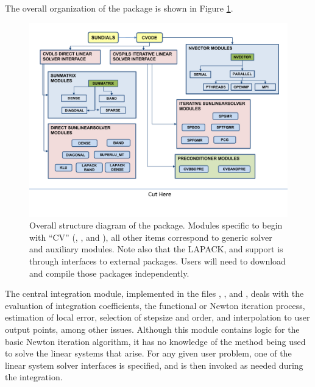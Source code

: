 The overall organization of the {\cvode} package is shown in Figure
\ref{f:cvorg}. 
\begin{figure}[!ht]
{\centerline{\includegraphics[width=\textwidth]{cvorg}}}
\caption [Overall structure diagram of the {\cvode} package]
{Overall structure diagram of the {\cvode} package.
  Modules specific to {\cvode} begin with ``CV'' ({\cvdls},
  {\cvspils}, {\cvbbdpre} and {\cvbandpre}), all other items correspond
  to generic solver and auxiliary modules. 
  Note also that the LAPACK, {\klu} and {\superlumt} support is
  through interfaces to external packages.  Users will need to
  download and compile those packages independently.}
\label{f:cvorg}
\end{figure}
The central integration module, implemented in the files ,
, and , deals with the evaluation of integration
coefficients, the functional or Newton iteration process, estimation of local
error, selection of stepsize and order, and interpolation to user output
points, among other issues.  Although this module contains logic for
the basic Newton iteration algorithm, it has no knowledge of the
method being used to solve the linear systems that arise.  For any
given user problem, one of the linear system solver interfaces is
specified, and is then invoked as needed during the integration. 

